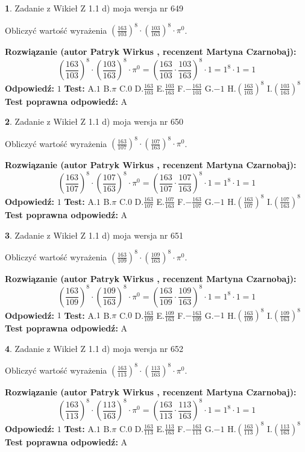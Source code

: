 \documentclass[12pt, a4paper]{article}
\theoremstyle{definition} %
\newtheorem{zad}{}
\newcommand{\zadStart}[1]{\begin{zad}#1\newline}
\newcommand{\zadStop}{\end{zad}}
\newcommand{\rozwStart}[2]{\noindent \textbf{Rozwiązanie (autor #1 , recenzent #2): }\newline}
\newcommand{\rozwStop}{\newline}
\newcommand{\odpStart}{\noindent \textbf{Odpowiedź:}\newline}
\newcommand{\odpStop}{\newline}
\newcommand{\testStart}{\noindent \textbf{Test:}\newline}
\newcommand{\testStop}{\newline}
\newcommand{\kluczStart}{\noindent \textbf{Test poprawna odpowiedź:}\newline}
\newcommand{\kluczStop}{\newline}
\begin{document}
\zadStart{Zadanie z Wikieł Z 1.1 d) moja wersja nr 649}

Obliczyć wartość wyrażenia $(\frac{163}{103})^{8} \cdot (\frac{103}{163})^{8} \cdot \pi^{0}$.
\zadStop
\rozwStart{Patryk Wirkus}{Martyna Czarnobaj}
$$(\frac{163}{103})^{8} \cdot (\frac{103}{163})^{8} \cdot \pi^{0} = (\frac{163}{103} \cdot \frac{103}{163})^{8} \cdot 1 = 1^{8} \cdot 1 = 1$$
\rozwStop
\odpStart
$1$
\odpStop
\testStart
A.$1$ B.$\pi$ C.$0$ D.$\frac{163}{103}$ E.$\frac{103}{163}$
F.$-\frac{163}{103}$ G.$-1$
H.$(\frac{163}{103})^{8}$
I.$(\frac{103}{163})^{8}$
\testStop
\kluczStart
A
\kluczStop



\zadStart{Zadanie z Wikieł Z 1.1 d) moja wersja nr 650}

Obliczyć wartość wyrażenia $(\frac{163}{107})^{8} \cdot (\frac{107}{163})^{8} \cdot \pi^{0}$.
\zadStop
\rozwStart{Patryk Wirkus}{Martyna Czarnobaj}
$$(\frac{163}{107})^{8} \cdot (\frac{107}{163})^{8} \cdot \pi^{0} = (\frac{163}{107} \cdot \frac{107}{163})^{8} \cdot 1 = 1^{8} \cdot 1 = 1$$
\rozwStop
\odpStart
$1$
\odpStop
\testStart
A.$1$ B.$\pi$ C.$0$ D.$\frac{163}{107}$ E.$\frac{107}{163}$
F.$-\frac{163}{107}$ G.$-1$
H.$(\frac{163}{107})^{8}$
I.$(\frac{107}{163})^{8}$
\testStop
\kluczStart
A
\kluczStop



\zadStart{Zadanie z Wikieł Z 1.1 d) moja wersja nr 651}

Obliczyć wartość wyrażenia $(\frac{163}{109})^{8} \cdot (\frac{109}{163})^{8} \cdot \pi^{0}$.
\zadStop
\rozwStart{Patryk Wirkus}{Martyna Czarnobaj}
$$(\frac{163}{109})^{8} \cdot (\frac{109}{163})^{8} \cdot \pi^{0} = (\frac{163}{109} \cdot \frac{109}{163})^{8} \cdot 1 = 1^{8} \cdot 1 = 1$$
\rozwStop
\odpStart
$1$
\odpStop
\testStart
A.$1$ B.$\pi$ C.$0$ D.$\frac{163}{109}$ E.$\frac{109}{163}$
F.$-\frac{163}{109}$ G.$-1$
H.$(\frac{163}{109})^{8}$
I.$(\frac{109}{163})^{8}$
\testStop
\kluczStart
A
\kluczStop



\zadStart{Zadanie z Wikieł Z 1.1 d) moja wersja nr 652}

Obliczyć wartość wyrażenia $(\frac{163}{113})^{8} \cdot (\frac{113}{163})^{8} \cdot \pi^{0}$.
\zadStop
\rozwStart{Patryk Wirkus}{Martyna Czarnobaj}
$$(\frac{163}{113})^{8} \cdot (\frac{113}{163})^{8} \cdot \pi^{0} = (\frac{163}{113} \cdot \frac{113}{163})^{8} \cdot 1 = 1^{8} \cdot 1 = 1$$
\rozwStop
\odpStart
$1$
\odpStop
\testStart
A.$1$ B.$\pi$ C.$0$ D.$\frac{163}{113}$ E.$\frac{113}{163}$
F.$-\frac{163}{113}$ G.$-1$
H.$(\frac{163}{113})^{8}$
I.$(\frac{113}{163})^{8}$
\testStop
\kluczStart
A
\kluczStop
\end{document}
